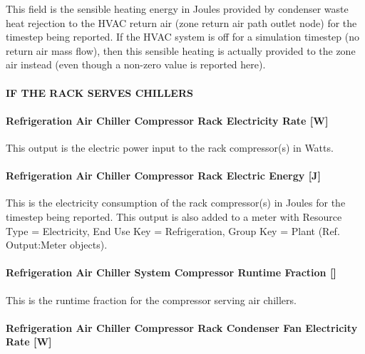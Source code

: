 This field is the sensible heating energy in Joules provided by condenser waste heat rejection to the HVAC return air (zone return air path outlet node) for the timestep being reported. If the HVAC system is off for a simulation timestep (no return air mass flow), then this sensible heating is actually provided to the zone air instead (even though a non-zero value is reported here).

\paragraph{IF THE RACK SERVES CHILLERS}\label{if-the-rack-serves-chillers}

\paragraph{Refrigeration Air Chiller Compressor Rack Electricity Rate {[}W{]}}\label{refrigeration-air-chiller-compressor-rack-electric-power-w}

This output is the electric power input to the rack compressor(s) in Watts.

\paragraph{Refrigeration Air Chiller Compressor Rack Electric Energy {[}J{]}}\label{refrigeration-air-chiller-compressor-rack-electric-energy-j}

This is the electricity consumption of the rack compressor(s) in Joules for the timestep being reported. This output is also added to a meter with Resource Type = Electricity, End Use Key = Refrigeration, Group Key = Plant (Ref. Output:Meter objects).

\paragraph{Refrigeration Air Chiller System Compressor Runtime Fraction {[]}}\label{refrigeration-air-chiller-system-compressor-runtime-fraction}

This is the runtime fraction for the compressor serving air chillers.

\paragraph{Refrigeration Air Chiller Compressor Rack Condenser Fan Electricity Rate {[}W{]}}\label{refrigeration-air-chiller-compressor-rack-condenser-fan-electric-power-w}

